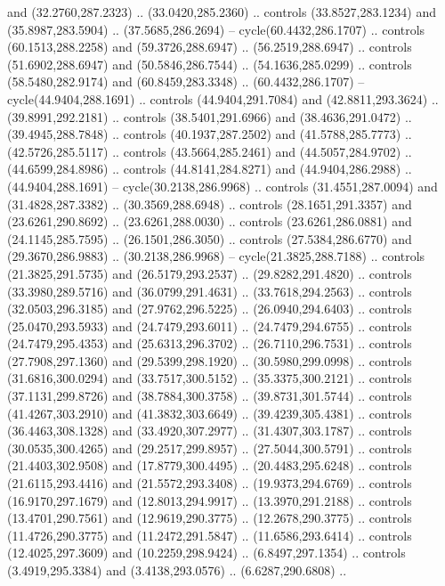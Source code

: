 \begin{scope}[cm={{1.25,0.0,0.0,-1.25,(0.0,743.43331)}}]
    and (32.2760,287.2323) .. (33.0420,285.2360) .. controls (33.8527,283.1234)
    and (35.8987,283.5904) .. (37.5685,286.2694) -- cycle(60.4432,286.1707) ..
    controls (60.1513,288.2258) and (59.3726,288.6947) .. (56.2519,288.6947) ..
    controls (51.6902,288.6947) and (50.5846,286.7544) .. (54.1636,285.0299) ..
    controls (58.5480,282.9174) and (60.8459,283.3348) .. (60.4432,286.1707) --
    cycle(44.9404,288.1691) .. controls (44.9404,291.7084) and (42.8811,293.3624)
    .. (39.8991,292.2181) .. controls (38.5401,291.6966) and (38.4636,291.0472) ..
    (39.4945,288.7848) .. controls (40.1937,287.2502) and (41.5788,285.7773) ..
    (42.5726,285.5117) .. controls (43.5664,285.2461) and (44.5057,284.9702) ..
    (44.6599,284.8986) .. controls (44.8141,284.8271) and (44.9404,286.2988) ..
    (44.9404,288.1691) -- cycle(30.2138,286.9968) .. controls (31.4551,287.0094)
    and (31.4828,287.3382) .. (30.3569,288.6948) .. controls (28.1651,291.3357)
    and (23.6261,290.8692) .. (23.6261,288.0030) .. controls (23.6261,286.0881)
    and (24.1145,285.7595) .. (26.1501,286.3050) .. controls (27.5384,286.6770)
    and (29.3670,286.9883) .. (30.2138,286.9968) -- cycle(21.3825,288.7188) ..
    controls (21.3825,291.5735) and (26.5179,293.2537) .. (29.8282,291.4820) ..
    controls (33.3980,289.5716) and (36.0799,291.4631) .. (33.7618,294.2563) ..
    controls (32.0503,296.3185) and (27.9762,296.5225) .. (26.0940,294.6403) ..
    controls (25.0470,293.5933) and (24.7479,293.6011) .. (24.7479,294.6755) ..
    controls (24.7479,295.4353) and (25.6313,296.3702) .. (26.7110,296.7531) ..
    controls (27.7908,297.1360) and (29.5399,298.1920) .. (30.5980,299.0998) ..
    controls (31.6816,300.0294) and (33.7517,300.5152) .. (35.3375,300.2121) ..
    controls (37.1131,299.8726) and (38.7884,300.3758) .. (39.8731,301.5744) ..
    controls (41.4267,303.2910) and (41.3832,303.6649) .. (39.4239,305.4381) ..
    controls (36.4463,308.1328) and (33.4920,307.2977) .. (31.4307,303.1787) ..
    controls (30.0535,300.4265) and (29.2517,299.8957) .. (27.5044,300.5791) ..
    controls (21.4403,302.9508) and (17.8779,300.4495) .. (20.4483,295.6248) ..
    controls (21.6115,293.4416) and (21.5572,293.3408) .. (19.9373,294.6769) ..
    controls (16.9170,297.1679) and (12.8013,294.9917) .. (13.3970,291.2188) ..
    controls (13.4701,290.7561) and (12.9619,290.3775) .. (12.2678,290.3775) ..
    controls (11.4726,290.3775) and (11.2472,291.5847) .. (11.6586,293.6414) ..
    controls (12.4025,297.3609) and (10.2259,298.9424) .. (6.8497,297.1354) ..
    controls (3.4919,295.3384) and (3.4138,293.0576) .. (6.6287,290.6808) ..

\end{scope}
